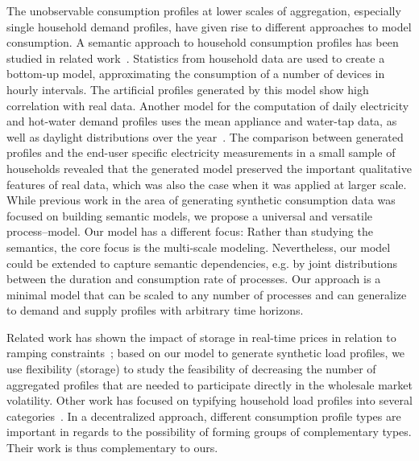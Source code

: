 \documentclass[conference]{IEEEtran}
\begin{document}
The unobservable consumption profiles at lower scales of aggregation, especially single household demand profiles, have given rise to different approaches to model consumption. A semantic approach to household consumption profiles has been studied in related work~\cite{paatero2006model}. Statistics from household data are used to create a bottom-up model, approximating the consumption of a number of devices in hourly intervals. The artificial profiles generated by this model show high correlation with real data.
Another model for the computation of daily electricity and hot-water demand profiles uses the mean appliance and water-tap data, as well as daylight distributions over the year~\cite{widen2009constructing}. The comparison between generated profiles and the end-user specific electricity measurements in a small sample of households revealed that the generated model preserved the important qualitative features of real data, which was also the case when it was applied at larger scale.
While previous work in the area of generating synthetic consumption data was focused on building semantic models, we propose a universal and versatile process--model. Our model has a different focus: Rather than studying the semantics, the core focus is the multi-scale modeling. Nevertheless, our model could be extended to capture semantic dependencies, e.g.  by joint distributions between the duration and consumption rate of processes. Our approach is a minimal model that can be scaled to any number of processes and can generalize to demand and supply profiles with arbitrary time horizons. %

Related work has shown the impact of storage in real-time prices in relation to ramping constraints~\cite{gast2013impact}; based on our model to generate synthetic load profiles, we use flexibility (storage) to study the feasibility of decreasing the number of aggregated profiles that are needed to participate directly in the wholesale market volatility.
Other work has focused on typifying household load profiles into several categories~\cite{flath2012cluster,hayn2014electricity}. In a decentralized approach, different consumption profile types are important in regards to the possibility of forming groups of complementary types. Their work is thus complementary to ours.
\end{document}
